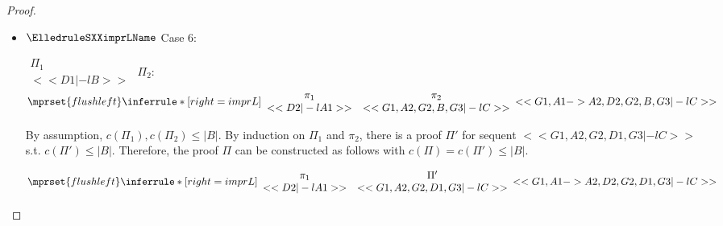 \begin{proof}
\begin{enumerate}
\begin{itemize}
  \item $\ElledruleSXXimprLName$ Case 6:
      \begin{center}
        \scriptsize
        \begin{math}
          \begin{array}{c}
            \Pi_1 \\
            {<<D1 |-l B>>}
          \end{array}
        \end{math}
        \qquad\qquad
        $\Pi_2$:
        \begin{math}
          $$\mprset{flushleft}
          \inferrule* [right={\tiny imprL}] {
            {
              \begin{array}{cc}
                \pi_1 & \pi_2 \\
                {<<D2 |-l A1>>} & {<<G1, A2, G2, B, G3 |-l C>>}
              \end{array}
            }
          }{<<G1, A1 -> A2, D2, G2, B, G3 |-l C>>}
        \end{math}
      \end{center}
      By assumption, $c(\Pi_1),c(\Pi_2)\leq |B|$. By induction on $\Pi_1$ and $\pi_2$, there is
      a proof $\Pi'$ for sequent $<<G1, A2, G2, D1, G3 |-l C>>$ s.t. $c(\Pi') \leq |B|$.
      Therefore, the proof $\Pi$ can be constructed as follows with
      $c(\Pi) = c(\Pi') \leq |B|$.
      \begin{center}
        \scriptsize
        \begin{math}
          $$\mprset{flushleft}
          \inferrule* [right={\tiny imprL}] {
            {
              \begin{array}{cc}
                \pi_1 & \Pi' \\
                {<<D2 |-l A1>>} & {<<G1, A2, G2, D1, G3 |-l C>>}
              \end{array}
            }
          }{<<G1, A1 -> A2, D2, G2, D1, G3 |-l C>>}
        \end{math}
      \end{center}


\end{itemize}
\end{enumerate}
\end{proof}
